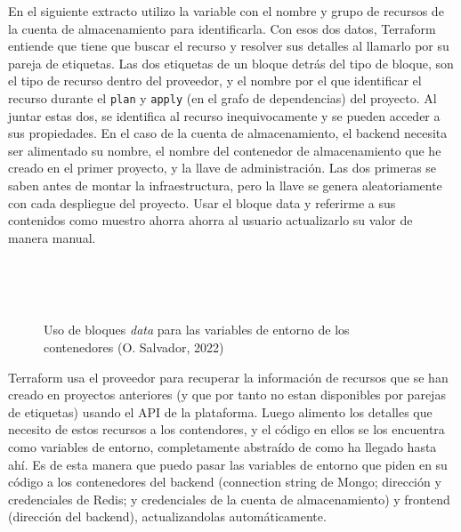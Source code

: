 \documentclass[11pt]{article}
\begin{document}
\begin{flushleft}
	En el siguiente extracto utilizo la variable con el nombre y grupo de recursos de la cuenta de almacenamiento para identificarla. Con esos dos datos, Terraform entiende que tiene que buscar el recurso y resolver sus detalles al llamarlo por su pareja de etiquetas. Las dos etiquetas de un bloque detrás del tipo de bloque, son el tipo de recurso dentro del proveedor, y el nombre por el que identificar el recurso durante el \texttt{plan} y \texttt{apply} (en el grafo de dependencias) del proyecto. Al juntar estas dos, se identifica al recurso inequivocamente y se pueden acceder a sus propiedades. En el caso de la cuenta de almacenamiento, el backend necesita ser alimentado su nombre, el nombre del contenedor de almacenamiento que he creado en el primer proyecto, y la llave de administración. Las dos primeras se saben antes de montar la infraestructura, pero la llave se genera aleatoriamente con cada despliegue del proyecto. Usar el bloque data y referirme a sus contenidos como muestro ahorra ahorra al usuario actualizarlo su valor de manera manual.
	\linebreak
	
		\begin{figure}[htb]
			\centering
			\begin{subfigure}{0.7\textwidth}
				\inputminted[fontsize=\scriptsize, firstline=6, lastline=9, linenos, frame=single, breaklines]{dockerfile}{../../backend/terraform/main.tf}
				\inputminted[fontsize=\scriptsize, firstline=21, lastline=21, linenos, frame=single, breaklines]{dockerfile}{../../backend/terraform/main.tf}
				\inputminted[fontsize=\scriptsize, firstline=45, lastline=45, linenos, frame=single, breaklines]{dockerfile}{../../backend/terraform/main.tf}
				\inputminted[fontsize=\scriptsize, firstline=51, lastline=51, linenos, frame=single, breaklines]{dockerfile}{../../backend/terraform/main.tf}
				\inputminted[fontsize=\scriptsize, firstline=56, lastline=59, linenos, frame=single, breaklines]{dockerfile}{../../backend/terraform/main.tf}
			\end{subfigure}
			\caption{Uso de bloques \textit{data} para las variables de entorno de los contenedores (O. Salvador, 2022)}
		\end{figure}
	
	Terraform usa el proveedor para recuperar la información de recursos que se han creado en proyectos anteriores (y que por tanto no estan disponibles por parejas de etiquetas) usando el API de la plataforma. Luego alimento los detalles que necesito de estos recursos a los contendores, y el código en ellos se los encuentra como variables de entorno, completamente abstraído de como ha llegado hasta ahí. Es de esta manera que puedo pasar las variables de entorno que piden en su código a los contenedores del backend (connection string de Mongo; dirección y credenciales de Redis; y credenciales de la cuenta de almacenamiento) y frontend (dirección del backend), actualizandolas automáticamente.
	\linebreak
	

\end{flushleft}
\end{document}
